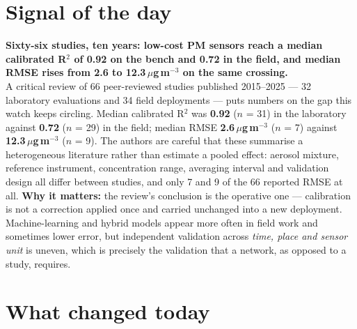 \documentclass[10pt]{article}
\begin{document}
\vspace{6mm}

\section*{\sffamily\bfseries\color{Deep}Signal of the day}
\vspace{-1.5mm}{\color{Amber}\rule{\linewidth}{1.1pt}}\vspace{2.5mm}

\begin{keybox}
{\sffamily\bfseries\small\color{Deep}Sixty-six studies, ten years: low-cost PM sensors reach a
median calibrated R$^2$ of 0.92 on the bench and 0.72 in the field, and median RMSE rises from
2.6 to 12.3\,$\mu$g\,m$^{-3}$ on the same crossing.}\\[1.4mm]
\footnotesize
A critical review of 66 peer-reviewed studies published 2015--2025 --- 32 laboratory evaluations and 34
field deployments --- puts numbers on the gap this watch keeps circling. Median calibrated R$^2$ was
\textbf{0.92} ($n$ = 31) in the laboratory against \textbf{0.72} ($n$ = 29) in the field; median RMSE
\textbf{2.6\,$\mu$g\,m$^{-3}$} ($n$ = 7) against \textbf{12.3\,$\mu$g\,m$^{-3}$} ($n$ = 9). The authors
are careful that these summarise a heterogeneous literature rather than estimate a pooled effect: aerosol
mixture, reference instrument, concentration range, averaging interval and validation design all differ
between studies, and only 7 and 9 of the 66 reported RMSE at all.
\textbf{Why it matters:} the review's conclusion is the operative one --- calibration is not a correction
applied once and carried unchanged into a new deployment. Machine-learning and hybrid models appear more
often in field work and sometimes lower error, but independent validation across \textit{time, place and
sensor unit} is uneven, which is precisely the validation that a network, as opposed to a study, requires.\par
\end{keybox}

\vspace{3mm}

\section*{\sffamily\bfseries\color{Deep}What changed today}
\vspace{-1.5mm}{\color{Amber}\rule{\linewidth}{1.1pt}}\vspace{2.5mm}
\end{document}
